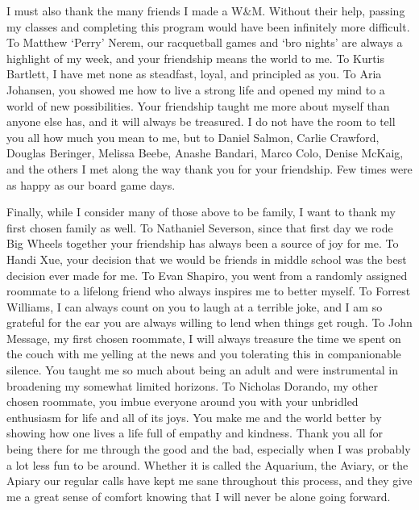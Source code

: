 \documentclass[../main.tex]{subfiles}
\begin{document}
\begin{singlespace}
{{I must also thank the many friends I made a W$\&$M. Without their help, passing my classes and completing this program would have been infinitely more difficult. To Matthew `Perry' Nerem, our racquetball games and `bro nights' are always a highlight of my week, and your friendship means the world to me. To Kurtis Bartlett, I have met none as steadfast, loyal, and principled as you. To Aria Johansen, you showed me how to live a strong life and opened my mind to a world of new possibilities. Your friendship taught me more about myself than anyone else has, and it will always be treasured. I do not have the room to tell you all how much you mean to me, but to Daniel Salmon, Carlie Crawford, Douglas Beringer, Melissa Beebe, Anashe Bandari, Marco Colo, Denise McKaig, and the others I met along the way thank you for your friendship. Few times were as happy as our board game days.\\

} %

{\parindent0pt %
                                                                                 
Finally, while I consider many of those above to be family, I want to thank my first chosen family as well. To Nathaniel Severson, since that first day we rode Big Wheels together your friendship has always been a source of joy for me. To Handi Xue, your decision that we would be friends in middle school was the best decision ever made for me. To Evan Shapiro, you went from a randomly assigned roommate to a lifelong friend who always inspires me to better myself. To Forrest Williams, I can always count on you to laugh at a terrible joke, and I am so grateful for the ear you are always willing to lend when things get rough. To John Message, my first chosen roommate, I will always treasure the time we spent on the couch with me yelling at the news and you tolerating this in companionable silence. You taught me so much about being an adult and were instrumental in broadening my somewhat limited horizons. To Nicholas Dorando, my other chosen roommate, you imbue everyone around you with your unbridled enthusiasm for life and all of its joys. You make me and the world better by showing how one lives a life full of empathy and kindness. Thank you all for being there for me through the good and the bad, especially when I was probably a lot less fun to be around. Whether it is called the Aquarium, the Aviary, or the Apiary our regular calls have kept me sane throughout this process, and they give me a great sense of comfort knowing that I will never be alone going forward.\\

}}
\end{singlespace}
\end{document}

